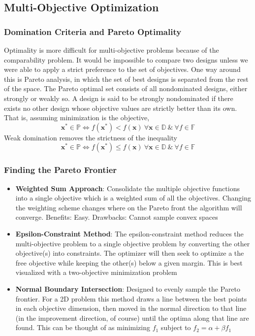 \documentclass[11pt]{article}
\newcommand{\Item}[1]{\item \textbf{#1}:}
\newcommand{\boldx}{\mathbf{x}}
\newcommand{\xstar}{\boldx^*}
\begin{document}
\subsection{Multi-Objective Optimization}
\subsubsection{Domination Criteria and Pareto Optimality}
Optimality is more difficult for multi-objective problems because of the comparability problem. It would be impossible to compare two designs unless we were able to apply a strict preference to the set of objectives. One way around this is Pareto analysis, in which the set of best designs is separated from the rest of the space. The Pareto optimal set consists of all nondominated designs, either strongly or weakly so. A design is said to be strongly nondominated if there exists no other design whose objective values are strictly better than its own. That is, assuming minimization is the objective,
$$\xstar\in\mathbb{P}\iff f(\xstar)<f(\boldx)\ \forall\boldx\in\mathbb{D}\ \&\ \forall f\in\mathbb{F}$$
Weak domination removes the strictness of the inequality
$$\xstar\in\mathbb{P}\iff f(\xstar)\leq f(\boldx)\ \forall\boldx\in\mathbb{D}\ \&\ \forall f\in\mathbb{F}$$

\subsubsection{Finding the Pareto Frontier}
\begin{itemize}
\Item{Weighted Sum Approach} Consolidate the multiple objective functions into a single objective which is a weighted sum of all the objectives. Changing the weighting scheme changes where on the Pareto front the algorithm will converge. Benefits: Easy. Drawbacks: Cannot sample convex spaces
\Item{Epsilon-Constraint Method} The epsilon-constraint method reduces the multi-objective problem to a single objective problem by converting the other objective(s) into constraints. The optimizer will then seek to optimize a the free objective while keeping the other(s) below a given margin. This is best visualized with a two-objective minimization problem
\Item{Normal Boundary Intersection} Designed to evenly sample the Pareto frontier. For a 2D problem this method draws a line between the best points in each objective dimension, then moved in the normal direction to that line (in the improvement direction, of course) until the optima along that line are found. This can be thought of as minimizing $f_1$ subject to $f_2=\alpha+\beta f_1$
\end{itemize}
\end{document}
